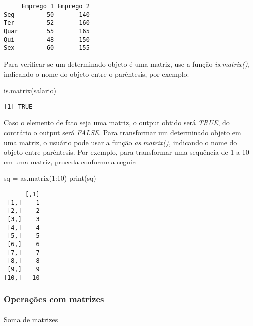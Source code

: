\documentclass[
  letterpaper,
  DIV=11,
  numbers=noendperiod]{scrreprt}
\makeatletter
\let\oldparagraph\paragraph
\renewcommand{\paragraph}{
    \@ifstar
      \xxxParagraphStar
      \xxxParagraphNoStar
  }
\newcommand{\xxxParagraphStar}[1]{\oldparagraph*{#1}\mbox{}}
\newcommand{\xxxParagraphNoStar}[1]{\oldparagraph{#1}\mbox{}}
\newenvironment{Shaded}{\begin{snugshade}}{\end{snugshade}}
\newcommand{\DecValTok}[1]{\textcolor[rgb]{0.68,0.00,0.00}{#1}}
\newcommand{\FunctionTok}[1]{\textcolor[rgb]{0.28,0.35,0.67}{#1}}
\newcommand{\NormalTok}[1]{\textcolor[rgb]{0.00,0.23,0.31}{#1}}
\newcommand{\OtherTok}[1]{\textcolor[rgb]{0.00,0.23,0.31}{#1}}
\newcommand{\SpecialCharTok}[1]{\textcolor[rgb]{0.37,0.37,0.37}{#1}}
\makeatother
\begin{document}
\begin{verbatim}
     Emprego 1 Emprego 2
Seg         50       140
Ter         52       160
Quar        55       165
Qui         48       150
Sex         60       155
\end{verbatim}

Para verificar se um determinado objeto é uma matriz, use a função
\emph{is.matrix(),} indicando o nome do objeto entre o parêntesis, por
exemplo:

\begin{Shaded}
\begin{Highlighting}[]
\FunctionTok{is.matrix}\NormalTok{(salario)}
\end{Highlighting}
\end{Shaded}

\begin{verbatim}
[1] TRUE
\end{verbatim}

Caso o elemento de fato seja uma matriz, o output obtido será
\emph{TRUE}, do contrário o output será \emph{FALSE}. Para transformar
um determinado objeto em uma matriz, o usuário pode usar a função
\emph{as.matrix(),} indicando o nome do objeto entre parêntesis. Por
exemplo, para transformar uma sequência de 1 a 10 em uma matriz, proceda
conforme a seguir:

\begin{Shaded}
\begin{Highlighting}[]
\NormalTok{sq }\OtherTok{=} \FunctionTok{as.matrix}\NormalTok{(}\DecValTok{1}\SpecialCharTok{:}\DecValTok{10}\NormalTok{)}
\FunctionTok{print}\NormalTok{(sq)}
\end{Highlighting}
\end{Shaded}

\begin{verbatim}
      [,1]
 [1,]    1
 [2,]    2
 [3,]    3
 [4,]    4
 [5,]    5
 [6,]    6
 [7,]    7
 [8,]    8
 [9,]    9
[10,]   10
\end{verbatim}

\subsubsection{Operações com
matrizes}\label{operauxe7uxf5es-com-matrizes}

\paragraph{Soma de matrizes}\label{soma-de-matrizes}
\end{document}
